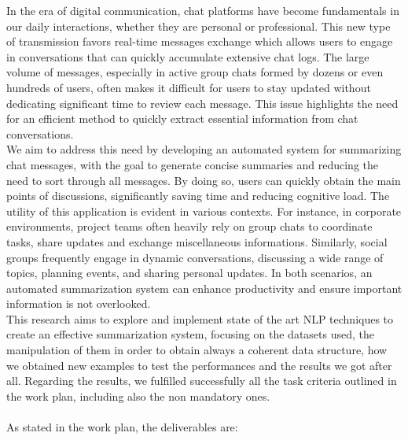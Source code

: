 \documentclass[10pt,twocolumn,letterpaper]{article}
\begin{document}
In the era of digital communication, chat platforms have become fundamentals in our daily interactions, whether they are personal or professional. This new type of transmission favors real-time messages exchange which allows users to engage in conversations that can quickly accumulate extensive chat logs. The large volume of messages, especially in active group chats formed by dozens or even hundreds of users, often makes it difficult for users to stay updated without dedicating significant time to review each message. This issue highlights the need for an efficient method to quickly extract essential information from chat conversations. \\
We aim to address this need by developing an automated system for summarizing chat messages, with the goal to generate concise summaries and reducing the need to sort through all messages. By doing so, users can quickly obtain the main points of discussions, significantly saving time and reducing cognitive load. The utility of this application is evident in various contexts. For instance, in corporate environments, project teams often heavily rely on group chats to coordinate tasks, share updates and exchange miscellaneous informations. Similarly, social groups frequently engage in dynamic conversations, discussing a wide range of topics, planning events, and sharing personal updates. In both scenarios, an automated summarization system can enhance productivity and ensure important information is not overlooked. \\
This research aims to explore and implement state of the art NLP techniques to create an effective summarization system, focusing on the datasets used, the manipulation of them in order to obtain always a coherent data structure, how we obtained new examples to test the performances and the results we got after all.
Regarding the results, we fulfilled successfully all the task criteria outlined in the work plan, including also the non mandatory ones. \\ \\
As stated in the work plan, the deliverables are:
\end{document}

